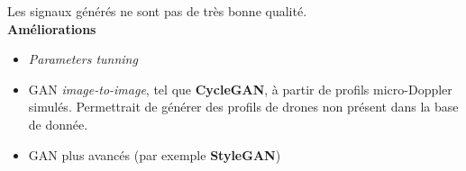 \documentclass[a0,portrait]{a0poster}
\begin{document}
\begin{multicols}{2}
\begin{tcolorbox}[colback=red!5!orange,colframe=red!75!black,title={\section*{Perspectives}}]
Les signaux générés ne sont pas de très bonne qualité.\\
\textbf{Améliorations}
\begin{itemize}
    \item \textit{Parameters tunning}
    \item GAN \textit{image-to-image}, tel que \textbf{CycleGAN}, à partir de profils micro-Doppler simulés. Permettrait de générer des profils de drones non présent dans la base de donnée.
    \item GAN plus avancés (par exemple \textbf{StyleGAN})
\end{itemize}
\end{tcolorbox}
\end{multicols}
\end{document}
